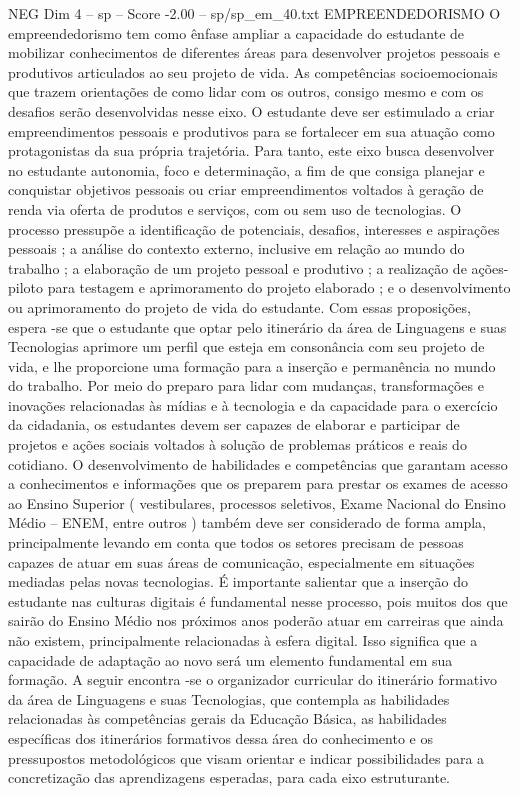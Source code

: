 \begin{textsample}{NEG Dim 4 – sp – Score -2.00 – sp/sp\_em\_40.txt}
EMPREENDEDORISMO O empreendedorismo tem como ênfase ampliar a capacidade do estudante de mobilizar conhecimentos de diferentes áreas para desenvolver projetos pessoais e produtivos articulados ao seu projeto de vida.
As competências socioemocionais que trazem orientações de como lidar com os outros, consigo mesmo e com os desafios serão desenvolvidas nesse eixo.
O estudante deve ser estimulado a criar empreendimentos pessoais e produtivos para se fortalecer em sua atuação como protagonistas da sua própria trajetória.
Para tanto, este eixo busca desenvolver no estudante autonomia, foco e determinação, a fim de que consiga planejar e conquistar objetivos pessoais ou criar empreendimentos voltados à geração de renda via oferta de produtos e serviços, com ou sem uso de tecnologias.
O processo pressupõe a identificação de potenciais, desafios, interesses e aspirações pessoais ; a análise do contexto externo, inclusive em relação ao mundo do trabalho ; a elaboração de um projeto pessoal e produtivo ; a realização de ações-piloto para testagem e aprimoramento do projeto elaborado ; e o desenvolvimento ou aprimoramento do projeto de vida do estudante.
Com essas proposições, espera -se que o estudante que optar pelo itinerário da área de Linguagens e suas Tecnologias aprimore um perfil que esteja em consonância com seu projeto de vida, e lhe proporcione uma formação para a inserção e permanência no mundo do trabalho.
Por meio do preparo para lidar com mudanças, transformações e inovações relacionadas às mídias e à tecnologia e da capacidade para o exercício da cidadania, os estudantes devem ser capazes de elaborar e participar de projetos e ações sociais voltados à solução de problemas práticos e reais do cotidiano.
O desenvolvimento de habilidades e competências que garantam acesso a conhecimentos e informações que os preparem para prestar os exames de acesso ao Ensino Superior ( vestibulares, processos seletivos, Exame Nacional do Ensino Médio – ENEM, entre outros ) também deve ser considerado de forma ampla, principalmente levando em conta que todos os setores precisam de pessoas capazes de atuar em suas áreas de comunicação, especialmente em situações mediadas pelas novas tecnologias.
É importante salientar que a inserção do estudante nas culturas digitais é fundamental nesse processo, pois muitos dos que sairão do Ensino Médio nos próximos anos poderão atuar em carreiras que ainda não existem, principalmente relacionadas à esfera digital.
Isso significa que a capacidade de adaptação ao novo será um elemento fundamental em sua formação.
A seguir encontra -se o organizador curricular do itinerário formativo da área de Linguagens e suas Tecnologias, que contempla as habilidades relacionadas às competências gerais da Educação Básica, as habilidades específicas dos itinerários formativos dessa área do conhecimento e os pressupostos metodológicos que visam orientar e indicar possibilidades para a concretização das aprendizagens esperadas, para cada eixo estruturante.

\end{textsample}

